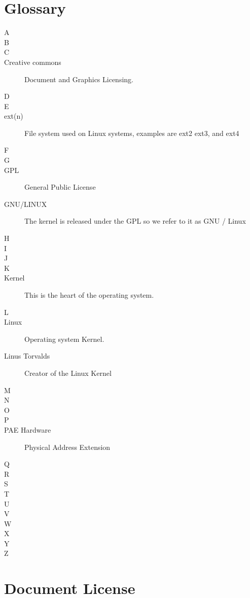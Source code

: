 \documentclass[12pt,a4paper]{book}
\begin{document}
\chapter{Glossary}
\begin{multicols}{2}


\begin{description}
\item[A]
\item[B]
\item[C]
\item[Creative commons] Document and Graphics Licensing.
\item[D]
\item[E]
\item[ext(n)] File system used on Linux systems, examples are ext2 ext3, and ext4 
\item[F]
\item[G]
\item[GPL] General Public License 
\item[GNU/LINUX] The kernel is released under the GPL so we refer to it as GNU / Linux
\item[H]
\item[I]
\item[J]
\item[K]
\item[Kernel] This is the heart of the operating system.
\columnbreak
\item[L]
\item[Linux] Operating system Kernel. 
\item[Linus Torvalds] Creator of the Linux Kernel
\item[M]
\item[N]
\item[O]
\item[P]
\item[PAE Hardware] Physical Address Extension 
\item[Q]
\item[R]
\item[S]
\item[T]
\item[U]
\item[V]
\item[W]
\item[X]
\item[Y]
\item[Z]
\end{description}
\end{multicols}
\chapter{Document License}

\end{document}
